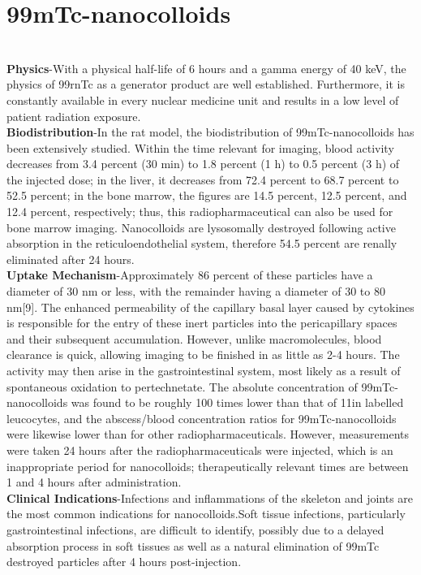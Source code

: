 \documentclass[12pt]{article}
\begin{document}
\section{99mTc-nanocolloids}
\\\textbf{Physics}-With a physical half-life of 6 hours and a gamma energy of 40 keV, the physics of 99rnTc as a generator product are well established. Furthermore, it is constantly available in every nuclear medicine unit and results in a low level of patient radiation exposure.
\\\textbf{Biodistribution}-In the rat model, the biodistribution of 99mTc-nanocolloids has been extensively studied. Within the time relevant for imaging, blood activity decreases from 3.4 percent (30 min) to 1.8 percent (1 h) to 0.5 percent (3 h) of the injected dose; in the liver, it decreases from 72.4 percent to 68.7 percent to 52.5 percent; in the bone marrow, the figures are 14.5 percent, 12.5 percent, and 12.4 percent, respectively; thus, this radiopharmaceutical can also be used for bone marrow imaging. Nanocolloids are lysosomally destroyed following active absorption in the reticuloendothelial system, therefore 54.5 percent are renally eliminated after 24 hours.
\\\textbf{Uptake Mechanism}-Approximately 86 percent of these particles have a diameter of 30 nm or less, with the remainder having a diameter of 30 to 80 nm[9]. The enhanced permeability of the capillary basal layer caused by cytokines is responsible for the entry of these inert particles into the pericapillary spaces and their subsequent accumulation. However, unlike macromolecules, blood clearance is quick, allowing imaging to be finished in as little as 2-4 hours. The activity may then arise in the gastrointestinal system, most likely as a result of spontaneous oxidation to pertechnetate. The absolute concentration of 99mTc-nanocolloids was found to be roughly 100 times lower than that of 11in labelled leucocytes, and the abscess/blood concentration ratios for 99mTc-nanocolloids were likewise lower than for other radiopharmaceuticals. However, measurements were taken 24 hours after the radiopharmaceuticals were injected, which is an inappropriate period for nanocolloids; therapeutically relevant times are between 1 and 4 hours after administration.
\\\textbf{Clinical Indications}-Infections and inflammations of the skeleton and joints are the most common indications for nanocolloids.Soft tissue infections, particularly gastrointestinal infections, are difficult to identify, possibly due to a delayed absorption process in soft tissues as well as a natural elimination of 99mTc destroyed particles after 4 hours post-injection.
\end{document}
